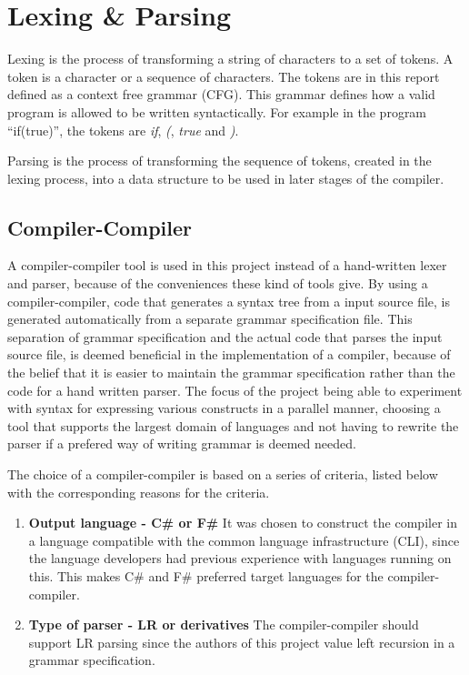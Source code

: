 \section{Lexing \& Parsing}
\label{sec:lexing/parsing}

Lexing is the process of transforming a string of characters to a set of tokens. A token is a character or a sequence of characters. The tokens are in this report defined as a context free grammar (CFG). This grammar defines how a valid program is allowed to be written syntactically. For example in the program \enquote{if(true)}, the tokens are \emph{if}, \emph{(}, \emph{true} and \emph{)}.

Parsing is the process of transforming the sequence of tokens, created in the lexing process, into a data structure to be used in later stages of the compiler.

\subsection{Compiler-Compiler}
\label{sec:compiler_compiler_choice}

A compiler-compiler tool is used in this project instead of a hand-written lexer and parser, because of the conveniences these kind of tools give. By using a compiler-compiler, code that generates a syntax tree from a input source file, is generated automatically from a separate grammar specification file. This separation of grammar specification and the actual code that parses the input source file, is deemed beneficial in the implementation of a compiler, because of the belief that it is easier to maintain the grammar specification rather than the code for a hand written parser. The focus of the project being able to experiment with syntax for expressing various constructs in a parallel manner, choosing a tool that supports the largest domain of languages and not having to rewrite the parser if a prefered way of writing grammar is deemed needed.

The choice of a compiler-compiler is based on a series of criteria, listed below with the corresponding reasons for the criteria.

\begin{enumerate}
\item \textbf{Output language - C\# or F\#} It was chosen to construct the compiler in a language compatible with the common language infrastructure (CLI), since the language developers had previous experience with languages running on this. This makes C\# and F\# preferred target languages for the compiler-compiler.

\item \textbf{Type of parser - LR or derivatives} The compiler-compiler should support LR parsing since the authors of this project value left recursion in a grammar specification.\\

\end{enumerate}

